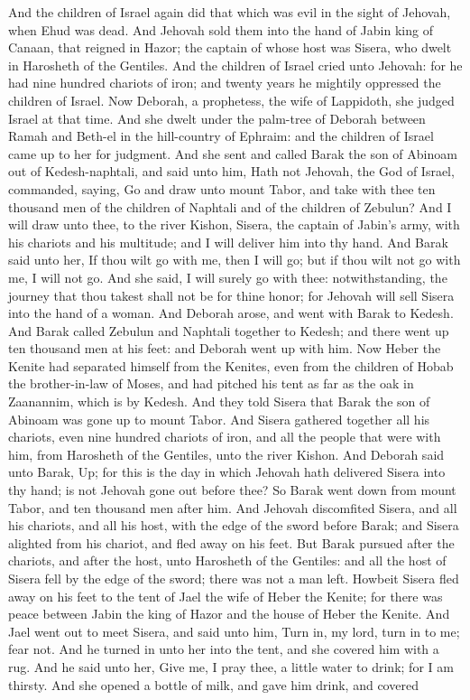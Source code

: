 And the children of Israel again did that which was evil in the sight of Jehovah, when Ehud was dead. And Jehovah sold them into the hand of Jabin king of Canaan, that reigned in Hazor; the captain of whose host was Sisera, who dwelt in Harosheth of the Gentiles. And the children of Israel cried unto Jehovah: for he had nine hundred chariots of iron; and twenty years he mightily oppressed the children of Israel.  Now Deborah, a prophetess, the wife of Lappidoth, she judged Israel at that time. And she dwelt under the palm-tree of Deborah between Ramah and Beth-el in the hill-country of Ephraim: and the children of Israel came up to her for judgment. And she sent and called Barak the son of Abinoam out of Kedesh-naphtali, and said unto him, Hath not Jehovah, the God of Israel, commanded, saying, Go and draw unto mount Tabor, and take with thee ten thousand men of the children of Naphtali and of the children of Zebulun? And I will draw unto thee, to the river Kishon, Sisera, the captain of Jabin’s army, with his chariots and his multitude; and I will deliver him into thy hand. And Barak said unto her, If thou wilt go with me, then I will go; but if thou wilt not go with me, I will not go. And she said, I will surely go with thee: notwithstanding, the journey that thou takest shall not be for thine honor; for Jehovah will sell Sisera into the hand of a woman. And Deborah arose, and went with Barak to Kedesh. And Barak called Zebulun and Naphtali together to Kedesh; and there went up ten thousand men at his feet: and Deborah went up with him.  Now Heber the Kenite had separated himself from the Kenites, even from the children of Hobab the brother-in-law of Moses, and had pitched his tent as far as the oak in Zaanannim, which is by Kedesh.  And they told Sisera that Barak the son of Abinoam was gone up to mount Tabor. And Sisera gathered together all his chariots, even nine hundred chariots of iron, and all the people that were with him, from Harosheth of the Gentiles, unto the river Kishon. And Deborah said unto Barak, Up; for this is the day in which Jehovah hath delivered Sisera into thy hand; is not Jehovah gone out before thee? So Barak went down from mount Tabor, and ten thousand men after him. And Jehovah discomfited Sisera, and all his chariots, and all his host, with the edge of the sword before Barak; and Sisera alighted from his chariot, and fled away on his feet. But Barak pursued after the chariots, and after the host, unto Harosheth of the Gentiles: and all the host of Sisera fell by the edge of the sword; there was not a man left.  Howbeit Sisera fled away on his feet to the tent of Jael the wife of Heber the Kenite; for there was peace between Jabin the king of Hazor and the house of Heber the Kenite. And Jael went out to meet Sisera, and said unto him, Turn in, my lord, turn in to me; fear not. And he turned in unto her into the tent, and she covered him with a rug. And he said unto her, Give me, I pray thee, a little water to drink; for I am thirsty. And she opened a bottle of milk, and gave him drink, and covered 